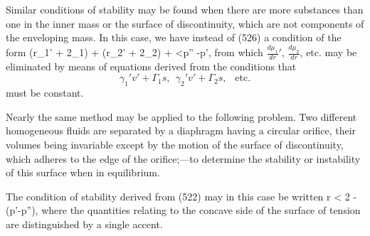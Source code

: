 \documentclass[12pt]{article}
\begin{document}
{Similar conditions of stability may be found when there are more substances than one in the inner mass or the surface of discontinuity, which are not components of the enveloping mass. In this case, we have instead of (526) a condition of the form
\eqs (r\gamma_1' + 2\Gamma_1)  + (r\gamma_2' + 2\Gamma_2)  +  <p'' -p',  \label{532} \eqe
from which $\frac{d\mu_1}{dr}'$, $\frac{d\mu_2}{dr}$, etc. may be eliminated by means of equations
derived from the conditions that
$$ \gamma_1' v' + \Gamma_1 s, \ \ \gamma_2' v' + \Gamma_2 s, \ \ \text{ etc.} $$ 
must be constant.

Nearly the same method may be applied to the following problem. Two different homogeneous fluids are separated by a diaphragm having a circular orifice, their volumes being invariable except by the motion of the surface of discontinuity, which adheres to the edge of the orifice;---to determine the stability or instability of this surface when in equilibrium.

The condition of stability derived from (522) may in this case be
written
\eqs r < 2 - (p'-p''), \label{535} \eqe
where the quantities relating to the concave side of the surface of tension are distinguished by a single accent.

}
\end{document}
